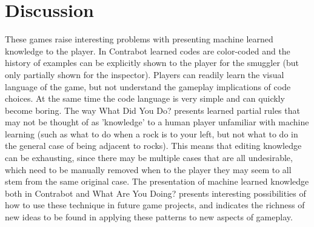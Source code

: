 \documentclass{sig-alternate}
\begin{document}
\section{Discussion}
These games raise interesting problems with presenting machine learned knowledge to the player.
In {\sc Contrabot} learned codes are color-coded and the history of examples can be explicitly shown to the player for the smuggler (but only partially shown for the inspector).
Players can readily learn the visual language of the game, but not understand the gameplay implications of code choices.
At the same time the code language is very simple and can quickly become boring.
The way {\sc What Did You Do?} presents learned partial rules that may not be thought of as 'knowledge' to a human player unfamiliar with machine learning (such as what to do when a rock is to your left, but not what to do in the general case of being adjacent to rocks).
This means that editing knowledge can be exhausting, since there may be multiple cases that are all undesirable, which need to be manually removed when to the player they may seem to all stem from the same original case.
%
The presentation of machine learned knowledge both in {\sc Contrabot} and {\sc What Are You Doing?} presents interesting possibilities of how to use these technique in future game projects, and indicates the richness of new ideas to be found in applying these patterns to new aspects of gameplay.




\end{document}
